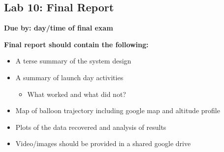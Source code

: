 \documentclass[11pt]{article}
\begin{document}
\subsection{Lab 10: Final Report}

{\bf Due by: day/time of final exam}

\noindent
{\bf Final report should contain the following:}

\begin{itemize}
    \item A terse summary of the system design
    \item A summary of launch day activities
\begin{itemize}
        \item What worked and what did not?
\end{itemize}
    \item Map of balloon trajectory including google map and altitude profile
    \item Plots of the data recovered and analysis of results
    \item Video/images should be provided in a shared google drive
\end{itemize}
\end{document}
